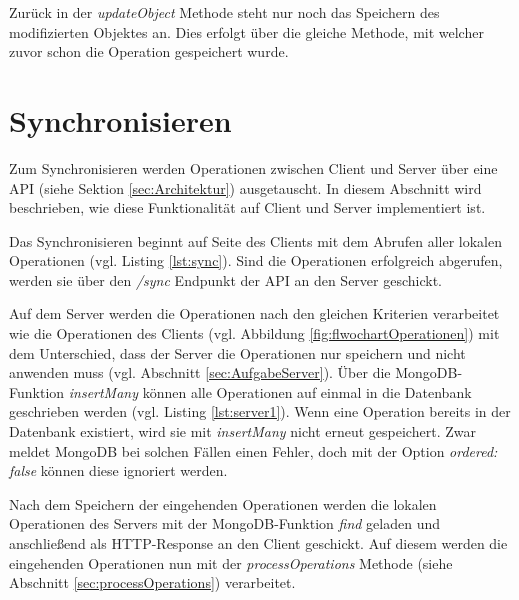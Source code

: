\documentclass[a4paper, 12pt]{scrreprt}
\begin{document}
Zurück in der \textit{updateObject} Methode steht nur noch das Speichern des modifizierten Objektes an. Dies erfolgt über die gleiche Methode, mit welcher zuvor schon die Operation gespeichert wurde.

\section{Synchronisieren}

Zum Synchronisieren werden Operationen zwischen Client und Server über eine API (siehe Sektion \ref{sec:Architektur}) ausgetauscht. In diesem Abschnitt wird beschrieben, wie diese Funktionalität auf Client und Server implementiert ist.

Das Synchronisieren beginnt auf Seite des Clients mit dem Abrufen aller lokalen Operationen (vgl. Listing \ref{lst:sync}). Sind die Operationen erfolgreich abgerufen, werden sie über den \textit{/sync} Endpunkt der API an den Server geschickt. 

\begin{minipage}{\linewidth}
	
\end{minipage}

Auf dem Server werden die Operationen nach den gleichen Kriterien verarbeitet wie die Operationen des Clients (vgl. Abbildung \ref{fig:flwochartOperationen}) mit dem Unterschied, dass der Server die Operationen nur speichern und nicht anwenden muss (vgl. Abschnitt \ref{sec:AufgabeServer}). Über die MongoDB-Funktion \textit{insertMany} können alle Operationen auf einmal in die Datenbank geschrieben werden (vgl. Listing  \ref{lst:server1}). Wenn eine Operation bereits in der Datenbank existiert, wird sie mit \textit{insertMany} nicht erneut gespeichert. Zwar meldet MongoDB bei solchen Fällen einen Fehler, doch mit der Option \textit{ordered: false} können diese ignoriert werden.

Nach dem Speichern der eingehenden Operationen werden die lokalen Operationen des Servers mit der MongoDB-Funktion \textit{find} geladen und anschließend als HTTP-Response an den Client geschickt. Auf diesem werden die eingehenden Operationen nun mit der \textit{processOperations} Methode (siehe Abschnitt \ref{sec:processOperations}) verarbeitet.

\begin{minipage}{\linewidth}
	
\end{minipage}
\end{document}
